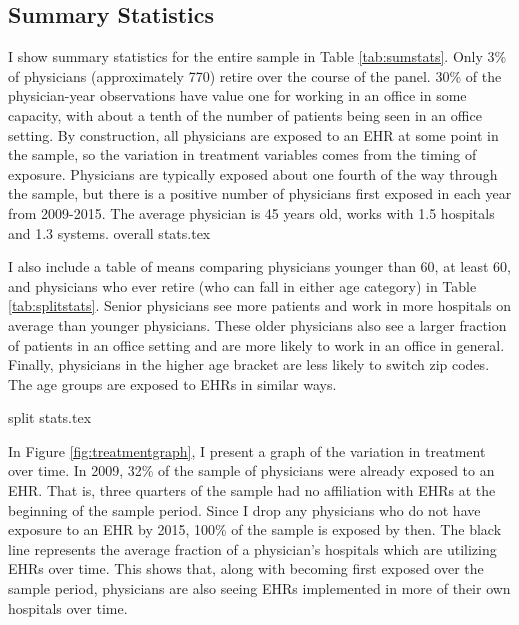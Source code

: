 \documentclass[11pt]{article}
\begin{document}
\subsection{Summary Statistics}

I show summary statistics for the entire sample in Table \ref{tab:sumstats}. Only 3\% of physicians (approximately 770) retire over the course of the panel. 30\% of the physician-year observations have value one for working in an office in some capacity, with about a tenth of the number of patients being seen in an office setting. By construction, all physicians are exposed to an EHR at some point in the sample, so the variation in treatment variables comes from the timing of exposure. Physicians are typically exposed about one fourth of the way through the sample, but there is a positive number of physicians first exposed in each year from 2009-2015. The average physician is 45 years old, works with 1.5 hospitals and 1.3 systems. 
{overall stats.tex}


I also include a table of means comparing physicians younger than 60, at least 60, and physicians who ever retire (who can fall in either age category) in Table \ref{tab:splitstats}. Senior physicians see more patients and work in more hospitals on average than younger physicians. These older physicians also see a larger fraction of patients in an office setting and are more likely to work in an office in general. Finally, physicians in the higher age bracket are less likely to switch zip codes. The age groups are exposed to EHRs in similar ways.


{split stats.tex}


In Figure \ref{fig:treatmentgraph}, I present a graph of the variation in treatment over time. In 2009, 32\% of the sample of physicians were already exposed to an EHR. That is, three quarters of the sample had no affiliation with EHRs at the beginning of the sample period. Since I drop any physicians who do not have exposure to an EHR by 2015, 100\% of the sample is exposed by then. The black line represents the average fraction of a physician's hospitals which are utilizing EHRs over time. This shows that, along with becoming first exposed over the sample period, physicians are also seeing EHRs implemented in more of their own hospitals over time.
\end{document}
